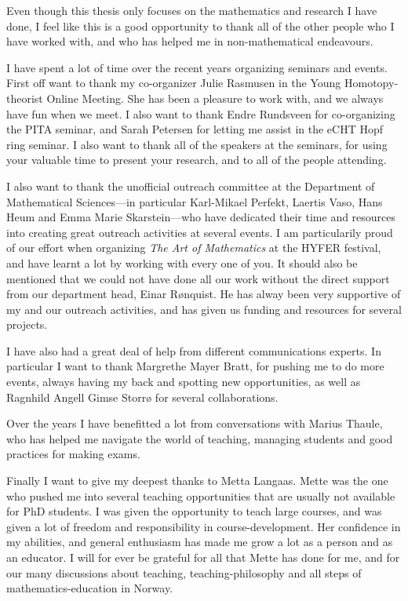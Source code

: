 Even though this thesis only focuses on the mathematics and research I have done, I feel like this is a good opportunity to thank all of the other people who I have worked with, and who has helped me in non-mathematical endeavours. 

I have spent a lot of time over the recent years organizing seminars and events. First off want to thank my co-organizer Julie Rasmusen in the Young Homotopy-theorist Online Meeting. She has been a pleasure to work with, and we always have fun when we meet. I also want to thank Endre Rundsveen for co-organizing the PITA seminar, and Sarah Petersen for letting me assist in the eCHT Hopf ring seminar. I also want to thank all of the speakers at the seminars, for using your valuable time to present your research, and to all of the people attending. 

I also want to thank the unofficial outreach committee at the Department of Mathematical Sciences---in particular Karl-Mikael Perfekt, Laertis Vaso, Hans Heum and Emma Marie Skarstein---who have dedicated their time and resources into creating great outreach activities at several events. I am particularily proud of our effort when organizing \emph{The Art of Mathematics} at the HYFER festival, and have learnt a lot by working with every one of you. It should also be mentioned that we could not have done all our work without the direct support from our department head, Einar Rønquist. He has alway been very supportive of my and our outreach activities, and has given us funding and resources for several projects. 

I have also had a great deal of help from different communications experts. In particular I want to thank Margrethe Mayer Bratt, for pushing me to do more events, always having my back and spotting new opportunities, as well as Ragnhild Angell Gimse Storrø for several collaborations. 

Over the years I have benefitted a lot from conversations with Marius Thaule, who has helped me navigate the world of teaching, managing students and good practices for making exams. 

Finally I want to give my deepest thanks to Metta Langaas. Mette was the one who pushed me into several teaching opportunities that are usually not available for PhD students. I was given the opportunity to teach large courses, and was given a lot of freedom and responsibility in course-development. Her confidence in my abilities, and general enthusiasm has made me grow a lot as a person and as an educator. I will for ever be grateful for all that Mette has done for me, and for our many discussions about teaching, teaching-philosophy and all steps of mathematics-education in Norway. 

